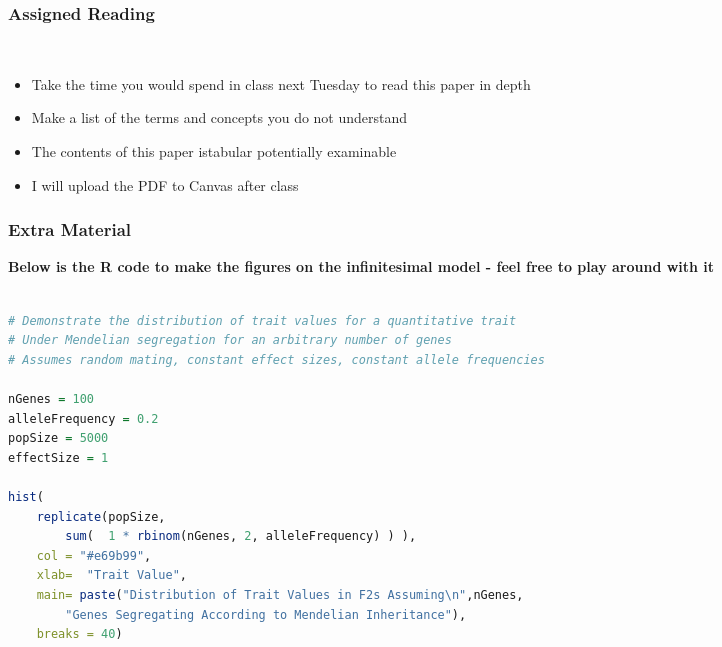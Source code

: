 \documentclass{beamer}
\begin{document}
\begin{frame}
	\frametitle{Assigned Reading}
	\centering
			\\
	
\begin{itemize}
	\item 	Take the time you would spend in class next Tuesday to read this paper in depth
	\item Make a list of the terms and concepts you do not understand\\
	\item The contents of this paper istabular potentially examinable
	
	\bigskip
	\item 	I will upload the PDF to Canvas after class

\end{itemize}
	
\end{frame}


\begin{frame}[fragile]
	\frametitle{Extra Material}
	
	\textbf{Below is the R code to make the figures on the infinitesimal model - feel free to play around with it}
	\begin{adjustbox}{max width=\textwidth}
		
	\begin{lstlisting}[language=R]

# Demonstrate the distribution of trait values for a quantitative trait
# Under Mendelian segregation for an arbitrary number of genes
# Assumes random mating, constant effect sizes, constant allele frequencies
	
nGenes = 100
alleleFrequency = 0.2
popSize = 5000
effectSize = 1
			
hist( 
	replicate(popSize,
		sum(  1 * rbinom(nGenes, 2, alleleFrequency) ) ),
	col = "#e69b99",
	xlab=  "Trait Value",
	main= paste("Distribution of Trait Values in F2s Assuming\n",nGenes, 
		"Genes Segregating According to Mendelian Inheritance"),
	breaks = 40)
		\end{lstlisting}
\end{adjustbox}
\end{frame}


\end{document}
